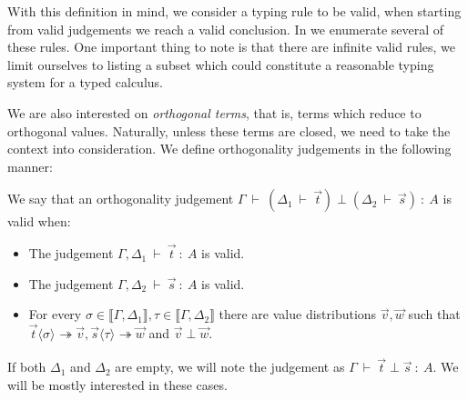 \documentclass[runningheads,orivec]{llncs}
\newcommand\ansubst[2]{\ensuremath{\langle #1 \rangle_{#2}}}
\def\eval{\twoheadrightarrow}
\def\sem#1{\llbracket#1\rrbracket}
\def\TYP#1#2#3{#1~{\vdash}~#2~{:}~#3}
\def\SORTH#1#2#3#4{#1~{\vdash}~#2\perp#3~{:}~#4}
\def\ORTH#1#2#3#4#5#6{#1~{\vdash}~(#2~{\vdash}~#3)\perp(#4~{\vdash}~#5)~{:}~#6}
\begin{document}
With this definition in mind, we consider a typing rule to be valid, when starting from valid judgements we reach a valid conclusion. In  we enumerate several of these rules. One important thing to note is that there are infinite valid rules, we limit ourselves to listing a subset which could constitute a reasonable typing system for a typed calculus.

We are also interested on \emph{orthogonal terms}, that is, terms which reduce to orthogonal values. Naturally, unless these terms are closed, we need to take the context into consideration. We define orthogonality judgements in the following manner:

\begin{definition}
    We say that an orthogonality judgement $\ORTH{\Gamma}{\Delta_1}{\vec{t}}{\Delta_2}{\vec{s}}{A}$ is valid when:
    \begin{itemize}
        \item The judgement $\TYP{\Gamma,\Delta_1}{\vec{t}}{A}$ is valid.
        \item The judgement $\TYP{\Gamma,\Delta_2}{\vec{s}}{A}$ is valid.
        \item For every $\sigma\in\sem{\Gamma,\Delta_1}, \tau\in\sem{\Gamma,\Delta_2}$ there are value distributions $\vec{v},\vec{w}$ such that $\vec{t}\ansubst{\sigma}{}\eval\vec{v}, \vec{s}\ansubst{\tau}{}\eval\vec{w}$ and $\vec{v}\perp\vec{w}$.
    \end{itemize}
\end{definition}

If both $\Delta_1$ and $\Delta_2$ are empty, we will note the judgement as $\SORTH{\Gamma}{\vec{t}}{\vec{s}}{A}$. We will be mostly interested in these cases.
\end{document}
